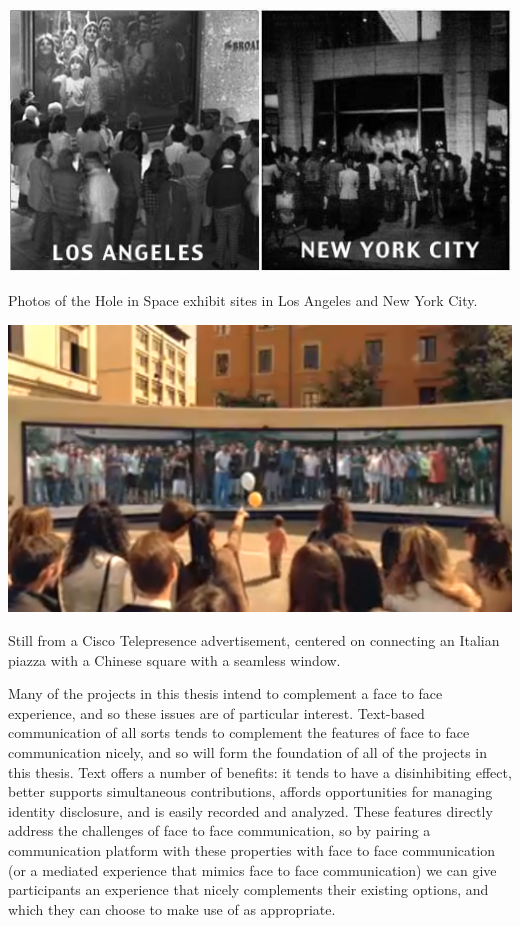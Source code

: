 \begin{marginfigure}
	\includegraphics{figures/hole_in_space.jpg}
	\caption{Photos of the Hole in Space exhibit sites in Los Angeles and New York City.}
	\label{fig:hole-in-space}
\end{marginfigure}

\begin{marginfigure}
	\includegraphics{figures/cisco-telepresence.png}
	\caption{Still from a Cisco Telepresence advertisement, centered on connecting an Italian piazza with a Chinese square with a seamless window.}
	\label{fig:cisco-telepresence}
\end{marginfigure}


Many of the projects in this thesis intend to complement a face to face experience, and so these issues are of particular interest. Text-based communication of all sorts tends to complement the features of face to face communication nicely, and so will form the foundation of all of the projects in this thesis. Text offers a number of benefits: it tends to have a disinhibiting effect, better supports simultaneous contributions, affords opportunities for managing identity disclosure, and is easily recorded and analyzed. These features directly address the challenges of face to face communication, so by pairing a communication platform with these properties with face to face communication (or a mediated experience that mimics face to face communication) we can give participants an experience that nicely complements their existing options, and which they can choose to make use of as appropriate.


